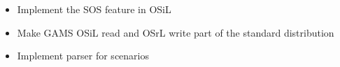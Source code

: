 %
%

\label{section:future-work}

\begin{itemize}


\item Implement the SOS feature in OSiL



\item Make GAMS OSiL read and OSrL write part of the standard distribution








\item Implement parser for scenarios


\end{itemize}
